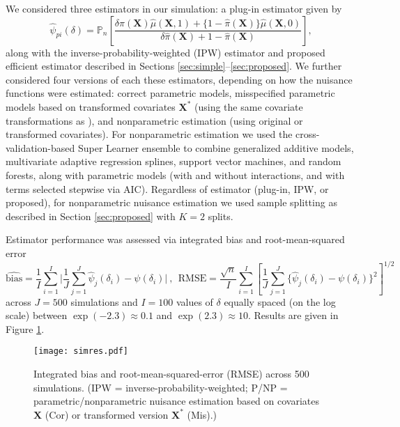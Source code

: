 \documentclass[12pt]{article}
\def\T{{ \mathrm{\scriptscriptstyle T} }}
\newcommand{\Pn}{\mathbb{P}_n}
\newcommand{\bX}{\mathbf{X}}
\theoremstyle{remark}
\begin{document}
We considered three estimators in our simulation: a plug-in estimator given by
$$ \hat\psi_{pi}(\delta) = \Pn \left[ \frac{\delta \hat\pi(\bX) \hat\mu(\bX,1) + \{1-\hat\pi(\bX)\} \hat\mu(\bX,0) }{\delta \hat\pi(\bX) + 1-\hat\pi(\bX)} \right] , $$
along with the inverse-probability-weighted (IPW) estimator and proposed efficient estimator described in Sections \ref{sec:simple}--\ref{sec:proposed}. We further considered four versions of each these estimators, depending on how the nuisance functions were estimated: correct parametric models, misspecified parametric models based on transformed covariates $\bX^*$ 
(using the same covariate transformations as \textcite{kang2007demystifying}), and nonparametric estimation (using original or transformed covariates). For nonparametric estimation we used the cross-validation-based Super Learner ensemble \autocite{van2007super} to combine generalized additive models, multivariate adaptive regression splines, support vector machines, and random forests, along with parametric models (with and without interactions, and with terms selected stepwise via AIC). Regardless of estimator (plug-in, IPW, or proposed), for nonparametric nuisance estimation we used sample splitting as described in Section \ref{sec:proposed} with $K=2$ splits.

Estimator performance was assessed via integrated bias and root-mean-squared error
$$ \widehat{\text{bias}} = \frac{1}{I} \sum_{i=1}^I \Big| \frac{1}{J} \sum_{j=1}^J \hat\psi_j(\delta_i) - \psi(\delta_i) \Big| \ , \ \ 
\widehat{\text{RMSE}} = \frac{\sqrt{n}}{I} \sum_{i=1}^I \left[ \frac{1}{J} \sum_{j=1}^J \Big\{ \hat\psi_j(\delta_i) - \psi(\delta_i) \Big\}^2 \right]^{1/2} $$
across $J=500$ simulations and $I=100$ values of $\delta$ equally spaced (on the log scale) between $\exp(-2.3) \approx 0.1$ and $\exp(2.3) \approx 10$. Results are given in Figure \ref{tab:simtab}.

\begin{figure}[h!]
\begin{center}
\texttt{[image: simres.pdf]}
\caption{Integrated bias and root-mean-squared-error (RMSE) across 500 simulations. (IPW = inverse-probability-weighted; 
P/NP = parametric/nonparametric nuisance estimation based on covariates $\bX$ (Cor) or transformed version $\bX^*$ (Mis).)} \label{tab:simtab}
\end{center}
\end{figure}
\end{document}
